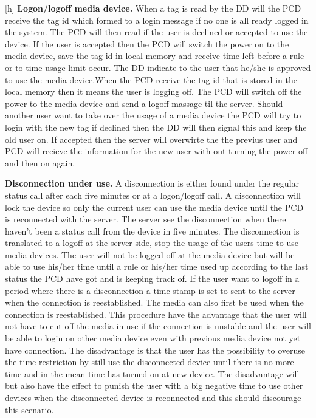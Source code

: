 \begin{center}[h]
\textbf{Logon/logoff media device.} \newline
When a tag is read by the DD will the PCD receive the tag id which formed to a login message if no one is all ready logged in the system. The PCD will then read if the user is declined or accepted to use the device. If the user is accepted then the PCD will switch the power on to the media device, save the tag id in local memory and receive time left before a rule or to time usage limit occur. The DD indicate to the user that he/she is approved to use the media device.\newline When the PCD receive the tag id that is stored in the local memory then it means the user is logging off. The PCD will switch off the power to the media device and send a logoff massage til the server. Should another user want to take over the usage of a media device the PCD will try to login with the new tag if declined then the DD will then signal this and keep the old user on. If accepted then the server will overwirte the the previus user and PCD will recieve the information for the new user with out turning the power off and then on again.\newline


\textbf{Disconnection under use.} \newline
A disconnection is either found under the regular status call after each five minutes or at a logon/logoff call. A disconnection will lock the device so only the current user can use the media device until the PCD is reconnected with the server. The server see the disconnection when there haven't been a status call from the device in five minutes. The disconnection is translated to a logoff at the server side, stop the usage of the users time to use media devices. The user will not be logged off at the media device but will be able to use his/her time until a rule or his/her time used up according to the last status the PCD have got and is keeping track of. If the user want to logoff in a period where there is a disconnection a time stamp is set to sent to the server when the connection is reestablished. The media can also first be used when the connection is reestablished.   
This procedure have the advantage that the user will not have to cut off the media in use if the connection is unstable and the user will be able to login on other media device even with previous media device not yet have connection. 
The disadvantage is that the user has the possibility to overuse the time restriction by still use the disconnected device until there is no more time and in the mean time has turned on at new device. 
The disadvantage will but also have the effect to punish the user with a big negative time to use other devices when the disconnected device is reconnected and this should discourage this scenario.       
    

\end{center}
